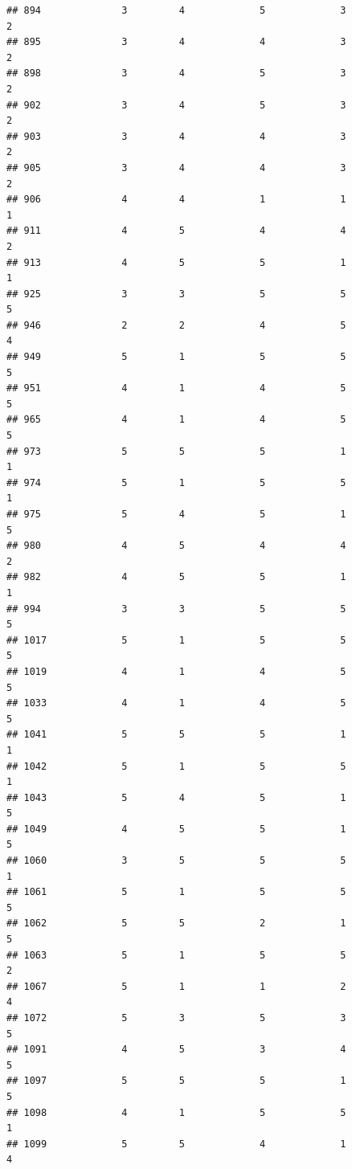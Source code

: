 \documentclass[
]{article}
\begin{document}
\begin{verbatim}
## 894              3         4             5             3           2
## 895              3         4             4             3           2
## 898              3         4             5             3           2
## 902              3         4             5             3           2
## 903              3         4             4             3           2
## 905              3         4             4             3           2
## 906              4         4             1             1           1
## 911              4         5             4             4           2
## 913              4         5             5             1           1
## 925              3         3             5             5           5
## 946              2         2             4             5           4
## 949              5         1             5             5           5
## 951              4         1             4             5           5
## 965              4         1             4             5           5
## 973              5         5             5             1           1
## 974              5         1             5             5           1
## 975              5         4             5             1           5
## 980              4         5             4             4           2
## 982              4         5             5             1           1
## 994              3         3             5             5           5
## 1017             5         1             5             5           5
## 1019             4         1             4             5           5
## 1033             4         1             4             5           5
## 1041             5         5             5             1           1
## 1042             5         1             5             5           1
## 1043             5         4             5             1           5
## 1049             4         5             5             1           5
## 1060             3         5             5             5           1
## 1061             5         1             5             5           5
## 1062             5         5             2             1           5
## 1063             5         1             5             5           2
## 1067             5         1             1             2           4
## 1072             5         3             5             3           5
## 1091             4         5             3             4           5
## 1097             5         5             5             1           5
## 1098             4         1             5             5           1
## 1099             5         5             4             1           4

\end{verbatim}
\end{document}
